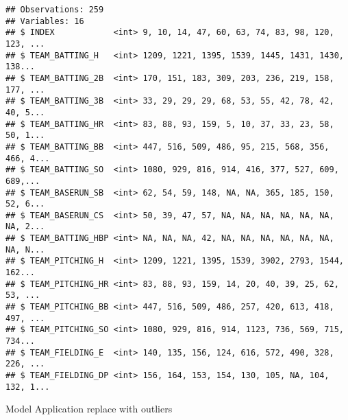 \documentclass[]{article}
\newenvironment{Shaded}{\begin{snugshade}}{\end{snugshade}}
\newcommand{\KeywordTok}[1]{\textcolor[rgb]{0.13,0.29,0.53}{\textbf{#1}}}
\newcommand{\DecValTok}[1]{\textcolor[rgb]{0.00,0.00,0.81}{#1}}
\newcommand{\FloatTok}[1]{\textcolor[rgb]{0.00,0.00,0.81}{#1}}
\newcommand{\StringTok}[1]{\textcolor[rgb]{0.31,0.60,0.02}{#1}}
\newcommand{\ControlFlowTok}[1]{\textcolor[rgb]{0.13,0.29,0.53}{\textbf{#1}}}
\newcommand{\OperatorTok}[1]{\textcolor[rgb]{0.81,0.36,0.00}{\textbf{#1}}}
\newcommand{\NormalTok}[1]{#1}
\begin{document}
\begin{verbatim}
## Observations: 259
## Variables: 16
## $ INDEX            <int> 9, 10, 14, 47, 60, 63, 74, 83, 98, 120, 123, ...
## $ TEAM_BATTING_H   <int> 1209, 1221, 1395, 1539, 1445, 1431, 1430, 138...
## $ TEAM_BATTING_2B  <int> 170, 151, 183, 309, 203, 236, 219, 158, 177, ...
## $ TEAM_BATTING_3B  <int> 33, 29, 29, 29, 68, 53, 55, 42, 78, 42, 40, 5...
## $ TEAM_BATTING_HR  <int> 83, 88, 93, 159, 5, 10, 37, 33, 23, 58, 50, 1...
## $ TEAM_BATTING_BB  <int> 447, 516, 509, 486, 95, 215, 568, 356, 466, 4...
## $ TEAM_BATTING_SO  <int> 1080, 929, 816, 914, 416, 377, 527, 609, 689,...
## $ TEAM_BASERUN_SB  <int> 62, 54, 59, 148, NA, NA, 365, 185, 150, 52, 6...
## $ TEAM_BASERUN_CS  <int> 50, 39, 47, 57, NA, NA, NA, NA, NA, NA, NA, 2...
## $ TEAM_BATTING_HBP <int> NA, NA, NA, 42, NA, NA, NA, NA, NA, NA, NA, N...
## $ TEAM_PITCHING_H  <int> 1209, 1221, 1395, 1539, 3902, 2793, 1544, 162...
## $ TEAM_PITCHING_HR <int> 83, 88, 93, 159, 14, 20, 40, 39, 25, 62, 53, ...
## $ TEAM_PITCHING_BB <int> 447, 516, 509, 486, 257, 420, 613, 418, 497, ...
## $ TEAM_PITCHING_SO <int> 1080, 929, 816, 914, 1123, 736, 569, 715, 734...
## $ TEAM_FIELDING_E  <int> 140, 135, 156, 124, 616, 572, 490, 328, 226, ...
## $ TEAM_FIELDING_DP <int> 156, 164, 153, 154, 130, 105, NA, 104, 132, 1...
\end{verbatim}

Model Application replace with outliers

\begin{Shaded}
\end{Shaded}
\end{document}

